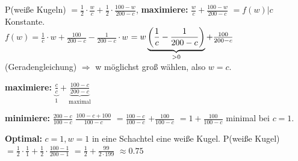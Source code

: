 P(weiße Kugeln)
$=\frac{1}{2} \cdot \frac{w}{c} + \frac{1}{2} \cdot \frac{100-w}{200-c}$, 
\textbf{maximiere:} $\frac{w}{c} + \frac{100-w}{200-c}$
$=f(w) | c $ Konstante. \\

$f(w) = \frac{1}{c} \cdot w + \frac{100}{200-c} - \frac{1}{200-c} \cdot w$
$=w \underbrace{ \left( \frac{1}{c} - \frac{1}{200-c} \right) }_{> 0} + \frac{100}{200-c}$ (Geradengleichung)
$\Rightarrow$ w möglichst groß wählen, also $w=c$.

\textbf{maximiere:} $\underbrace{\frac{c}{c}}_{1} + \underbrace{\frac{100-c}{200-c}}_{\textrm{maximal}}$

\textbf{minimiere:} $\frac{200-c}{100-c}$
$\frac{100-c+100}{100-c}$
$=\frac{100-c}{100-c}$
$+ \frac{100}{100-c}$
$=1 + \frac{100}{100-c}$ minimal bei $c=1$. 

\textbf{Optimal:} $c=1, w=1$ in eine Schachtel eine weiße Kugel. 
P(weiße Kugel) $=\frac{1}{2} \cdot \frac{1}{1} + \frac{1}{2} \cdot \frac{100-1}{200-1}$
$=\frac{1}{2} + \frac{99}{2\cdot 199}$
$\approx 0.75$ 